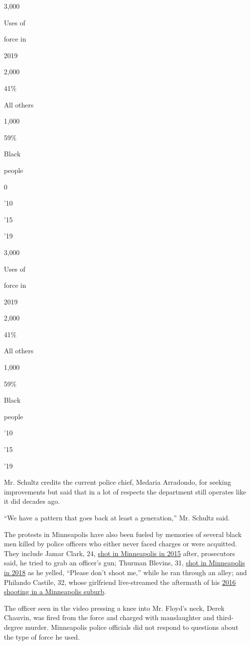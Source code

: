 3,000

Uses of

force in

2019

2,000

41\%

All others

1,000

59\%

Black

people

0

'10

'15

'19

3,000

Uses of

force in

2019

2,000

41\%

All others

1,000

59\%

Black

people

'10

'15

'19

Mr. Schultz credits the current police chief, Medaria Arradondo, for
seeking improvements but said that in a lot of respects the department
still operates like it did decades ago.

``We have a pattern that goes back at least a generation,'' Mr. Schultz
said.

The protests in Minneapolis have also been fueled by memories of several
black men killed by police officers who either never faced charges or
were acquitted. They include Jamar Clark, 24,
\href{https://www.nytimes3xbfgragh.onion/2016/03/31/us/jamar-clark-shooting-minneapolis.html}{shot
in Minneapolis in 2015} after, prosecutors said, he tried to grab an
officer's gun; Thurman Blevins, 31,
\href{https://www.nytimes3xbfgragh.onion/2018/07/30/us/minneapolis-police-thurman-blevins.html}{shot
in Minneapolis in 2018} as he yelled, ``Please don't shoot me,'' while
he ran through an alley; and Philando Castile, 32, whose girlfriend
live-streamed the aftermath of his
\href{https://www.nytimes3xbfgragh.onion/2017/06/16/us/police-shooting-trial-philando-castile.html}{2016
shooting in a Minneapolis suburb}.

The officer seen in the video pressing a knee into Mr. Floyd's neck,
Derek Chauvin, was fired from the force and charged with manslaughter
and third-degree murder. Minneapolis police officials did not respond to
questions about the type of force he used.

